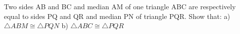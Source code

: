 \noindent Two sides AB and BC and median AM of one triangle ABC are respectively equal to sides PQ and QR and median PN of triangle PQR. Show that:
\newline
a) $\triangle ABM \cong \triangle PQN$
\newline 
b) $\triangle ABC \cong \triangle PQR$

